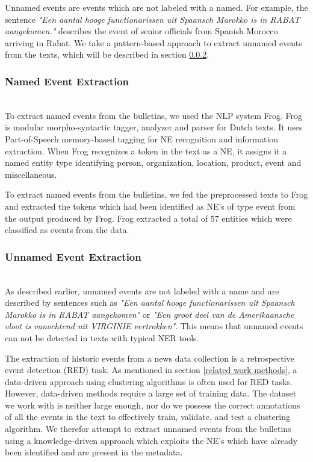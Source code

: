 \documentclass[a4paper, 10pt, conference]{ieeeconf}      %
\begin{document}
Unnamed events are events which are not labeled with a named. For example, the sentence \textit{"Een aantal hooge functionarissen uit Spaansch Marokko is in RABAT aangekomen."} describes the event of senior officials from Spanish Morocco arriving in Rabat. We take a pattern-based approach to extract unnamed events from the texts, which will be described in section \ref{unnamed}. 

\subsubsection{Named Event Extraction}\label{named}~\\
To extract named events from the bulletins, we used the NLP system Frog. Frog is modular morpho-syntactic tagger, analyzer and parser for Dutch texts\cite{bosch2007Frog}. It uses Part-of-Speech memory-based tagging for NE recognition and information extraction\cite{daelemans2010mbt}. When Frog recognizes a token in the text as a NE, it assigns it a named entity type identifying person, organization, location, product, event and miscellaneous. 

To extract named events from the bulletins, we fed the preprocessed texts to Frog and extracted the tokens which had been identified as NE's of type event from the output produced by Frog. Frog extracted a total of 57 entities which were classified as events from the data.

\subsubsection{Unnamed Event Extraction}\label{unnamed}~\\
As described earlier, unnamed events are not labeled with a name and are described by sentences such as \textit{"Een aantal hooge functionarissen uit Spaansch Marokko is in RABAT aangekomen"} or \textit{"Een groot deel van de Amerikaansche vloot is vanochtend uit VIRGINIE vertrokken"}. This means that unnamed events can not be detected in texts with typical NER tools. 

The extraction of historic events from a news data collection is a retrospective event detection (RED) task. As mentioned in section \ref{related work methods}, a data-driven approach using clustering algorithms is often used for RED tasks. However, data-driven methods require a large set of training data. The dataset we work with is neither large enough, nor do we possess the correct annotations of all the events in the text to effectively train, validate, and test a clustering algorithm. We therefor attempt to extract unnamed events from the bulletins using a knowledge-driven approach which exploits the NE's which have already been identified and are present in the metadata.
\end{document}
